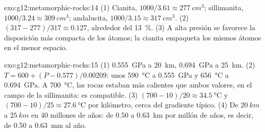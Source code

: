 \begin{solution}{exo:g12:metamorphic-rocks:14}
(1) Cianita, $1000/3.61 \approx \qty{277}{cm^3}$; sillimanita, $1000/3.24
\approx \qty{309}{cm^3}$; andalucita, $1000/3.15 \approx \qty{317}{cm^3}$.
(2) $(317 - 277)/317 \approx 0.127$, alrededor del \qty{13}{\percent}. (3) A
alta presión se favorece la disposición más compacta de los átomos; la
cianita empaqueta los mismos átomos en el menor espacio.
\end{solution}

\begin{solution}{exo:g12:metamorphic-rocks:15}
(1) \qty{0.555}{GPa} a \qty{20}{km}, \qty{0.694}{GPa} a \qty{25}{km}.
(2) $T = 600 + (P - 0.577)/0.00209$: unos \qty{590}{\celsius} a
\qty{0.555}{GPa} y \qty{656}{\celsius} a \qty{0.694}{GPa}. A
\qty{700}{\celsius}, las rocas estaban más calientes que ambos valores, en el
campo de la sillimanita: es compatible. (3) $(700 - 10)/20 \approx \qty{34.5}{\celsius}$ y
$(700 - 10)/25 \approx \qty{27.6}{\celsius}$ por kilómetro, cerca del
gradiente típico. (4) De $\qty{20}{km}$ a $\qty{25}{km}$ en 40 millones de años:
de 0.50 a \qty{0.63}{km} por millón de años, es decir, de 0.50 a
\qty{0.63}{mm} al año.
\end{solution}

